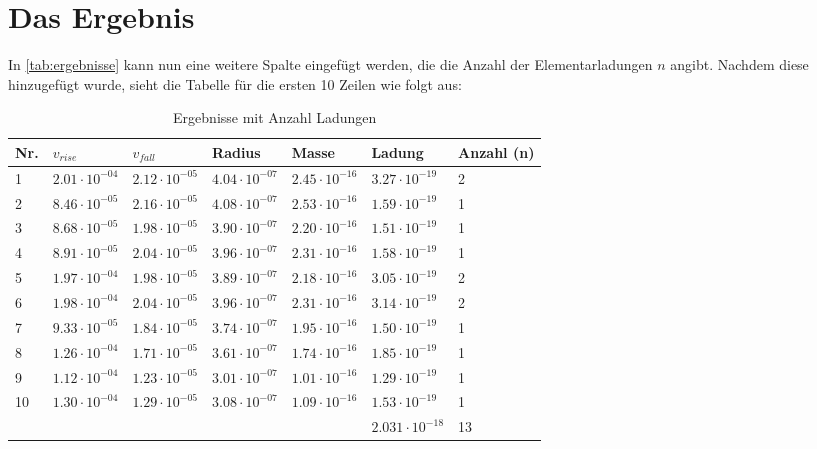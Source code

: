 \section{Das Ergebnis}\label{sec:ergebnis}
In \autoref{tab:ergebnisse} kann nun eine weitere Spalte eingefügt werden, die die Anzahl der Elementarladungen $n$ angibt. Nachdem diese hinzugefügt wurde, sieht die Tabelle für die ersten 10 Zeilen wie folgt aus:

\begin{table}[H]
	\centering
	\begin{tabular}{llllll|l}
		\toprule
		Nr. & $v_{rise}$ & $v_{fall}$ & Radius & Masse & Ladung & Anzahl (n) \\
		\midrule
		1 &$\mathrm{2.01 \cdot 10^{-04}}$ & $\mathrm{2.12 \cdot 10^{-05}}$ & $\mathrm{4.04 \cdot 10^{-07}}$ & $\mathrm{2.45 \cdot 10^{-16}}$ & $\mathrm{3.27 \cdot 10^{-19}}$ & 2\\
		2 &$\mathrm{8.46 \cdot 10^{-05}}$ & $\mathrm{2.16 \cdot 10^{-05}}$ & $\mathrm{4.08 \cdot 10^{-07}}$ & $\mathrm{2.53 \cdot 10^{-16}}$ & $\mathrm{1.59 \cdot 10^{-19}}$ & 1\\
		3 &$\mathrm{8.68 \cdot 10^{-05}}$ & $\mathrm{1.98 \cdot 10^{-05}}$ & $\mathrm{3.90 \cdot 10^{-07}}$ & $\mathrm{2.20 \cdot 10^{-16}}$ & $\mathrm{1.51 \cdot 10^{-19}}$ & 1\\
		4 &$\mathrm{8.91 \cdot 10^{-05}}$ & $\mathrm{2.04 \cdot 10^{-05}}$ & $\mathrm{3.96 \cdot 10^{-07}}$ & $\mathrm{2.31 \cdot 10^{-16}}$ & $\mathrm{1.58 \cdot 10^{-19}}$ & 1\\
		5 &$\mathrm{1.97 \cdot 10^{-04}}$ & $\mathrm{1.98 \cdot 10^{-05}}$ & $\mathrm{3.89 \cdot 10^{-07}}$ & $\mathrm{2.18 \cdot 10^{-16}}$ & $\mathrm{3.05 \cdot 10^{-19}}$ & 2\\
		6 &$\mathrm{1.98 \cdot 10^{-04}}$ & $\mathrm{2.04 \cdot 10^{-05}}$ & $\mathrm{3.96 \cdot 10^{-07}}$ & $\mathrm{2.31 \cdot 10^{-16}}$ & $\mathrm{3.14 \cdot 10^{-19}}$ & 2\\
		7 &$\mathrm{9.33 \cdot 10^{-05}}$ & $\mathrm{1.84 \cdot 10^{-05}}$ & $\mathrm{3.74 \cdot 10^{-07}}$ & $\mathrm{1.95 \cdot 10^{-16}}$ & $\mathrm{1.50 \cdot 10^{-19}}$ & 1\\
		8 &$\mathrm{1.26 \cdot 10^{-04}}$ & $\mathrm{1.71 \cdot 10^{-05}}$ & $\mathrm{3.61 \cdot 10^{-07}}$ & $\mathrm{1.74 \cdot 10^{-16}}$ & $\mathrm{1.85 \cdot 10^{-19}}$ & 1\\
		9 &$\mathrm{1.12 \cdot 10^{-04}}$ & $\mathrm{1.23 \cdot 10^{-05}}$ & $\mathrm{3.01 \cdot 10^{-07}}$ & $\mathrm{1.01 \cdot 10^{-16}}$ & $\mathrm{1.29 \cdot 10^{-19}}$ & 1\\
		10 &$\mathrm{1.30 \cdot 10^{-04}}$ & $\mathrm{1.29 \cdot 10^{-05}}$ & $\mathrm{3.08 \cdot 10^{-07}}$ & $\mathrm{1.09 \cdot 10^{-16}}$ & $\mathrm{1.53 \cdot 10^{-19}}$ & 1\\
		\bottomrule
		&&&&& $2.031 \cdot 10^{-18}$ & 13 \\
	\end{tabular}
	\caption{Ergebnisse mit Anzahl Ladungen}
	\label{tab:anzahlLadung}
\end{table}
